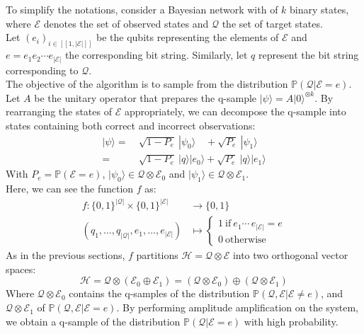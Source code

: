 To simplify the notations, consider a Bayesian network with of $k$ binary states, where $\mathcal{E}$ denotes the set of observed states and $\mathcal{Q}$ the set of target states.
\\[5pt]
Let $(e_i)_{i \in [\![1,|\mathcal{E}|]\!]}$ be the qubits representing the elements of $\mathcal{E}$ and $e = e_1e_2\cdots e_{|\mathcal{E}|}$ the corresponding bit string. Similarly, let $q$ represent the bit string corresponding to $\mathcal{Q}$.
\\[5pt]
The objective of the algorithm is to sample from the distribution $\mathbb{P}(\mathcal{Q}|\mathcal{E}=e)$.
\\[5pt]
Let $A$ be the unitary operator that prepares the q-sample $| \psi \rangle = A |0\rangle ^{\otimes k}$. By rearranging the states of $\mathcal{E}$ appropriately, we can decompose the q-sample into states containing both correct and incorrect observations:
\begin{align*}
	|\psi \rangle =&\ \sqrt{1-P_e}\ |\psi_0\rangle \quad + \sqrt{P_e}\ |\psi_1\rangle \\
	=&\ \sqrt{1-P_e}\ |q\rangle |e_0\rangle + \sqrt{P_e}\ |q\rangle |e_1\rangle
\end{align*}
With $P_e = \mathbb{P}(\mathcal{E}=e)$, $|\psi_0 \rangle \in \mathcal{Q} \otimes \mathcal{E}_0$ and $|\psi_1 \rangle \in \mathcal{Q} \otimes \mathcal{E}_1$.
\\[5pt]
Here, we can see the function $f$ as:
\begin{align*}
    f : \{0,1\}^{|\mathcal{Q}|}\times\{0,1\}^{|\mathcal{E}|} &\longrightarrow \{0,1\} \\
    (q_1,\hdots,q_{|\mathcal{Q}|}, e_1,\hdots,e_{|\mathcal{E}|}) &\longmapsto
 \begin{cases}
 1 \ \mathrm{if} \ e_1 \cdots \, e_{|\mathcal{E}|} = e \\
 0 \ \mathrm{otherwise}
 \end{cases}
\end{align*}
As in the previous sections, $f$ partitions $\mathcal{H} = \mathcal{Q} \otimes \mathcal{E}$ into two orthogonal vector spaces:
\[\mathcal{H} = \mathcal{Q} \otimes (\mathcal{E}_0 \oplus \mathcal{E}_1) = (\mathcal{Q} \otimes \mathcal{E}_0) \oplus (\mathcal{Q} \otimes \mathcal{E}_1)\]
Where $\mathcal{Q} \otimes \mathcal{E}_0$ contains the q-samples of the distribution $\mathbb{P}(\mathcal{Q,E}|\mathcal{E}\neq e)$, and $\mathcal{Q} \otimes \mathcal{E}_1$ of $\mathbb{P}(\mathcal{Q,E}|\mathcal{E} = e)$.
By performing amplitude amplification on the system, we obtain a q-sample of the distribution $\mathbb{P}(\mathcal{Q}|\mathcal{E} = e)$ with high probability.

